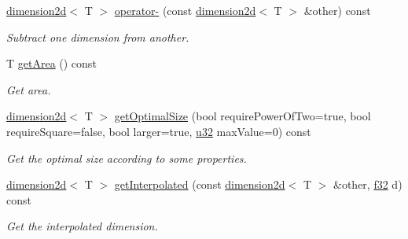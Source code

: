 \begin{DoxyCompactItemize}
\mbox{\label{classirr_1_1core_1_1dimension2d_aec5df4b45e5af7fa0fe13f2b0c6d5976}} 
\hyperlink{classirr_1_1core_1_1dimension2d}{dimension2d}$<$ T $>$ \hyperlink{classirr_1_1core_1_1dimension2d_aec5df4b45e5af7fa0fe13f2b0c6d5976}{operator-\/} (const \hyperlink{classirr_1_1core_1_1dimension2d}{dimension2d}$<$ T $>$ \&other) const
\begin{DoxyCompactList}\small\item\em Subtract one dimension from another. \end{DoxyCompactList}\item 
\mbox{\label{classirr_1_1core_1_1dimension2d_a320dee7a21500fd4625ab7660a33248b}} 
T \hyperlink{classirr_1_1core_1_1dimension2d_a320dee7a21500fd4625ab7660a33248b}{get\+Area} () const
\begin{DoxyCompactList}\small\item\em Get area. \end{DoxyCompactList}\item 
\hyperlink{classirr_1_1core_1_1dimension2d}{dimension2d}$<$ T $>$ \hyperlink{classirr_1_1core_1_1dimension2d_a5861f95f79fe5a23a0f2d867b6ca70fc}{get\+Optimal\+Size} (bool require\+Power\+Of\+Two=true, bool require\+Square=false, bool larger=true, \hyperlink{namespaceirr_a0416a53257075833e7002efd0a18e804}{u32} max\+Value=0) const
\begin{DoxyCompactList}\small\item\em Get the optimal size according to some properties. \end{DoxyCompactList}\item 
\hyperlink{classirr_1_1core_1_1dimension2d}{dimension2d}$<$ T $>$ \hyperlink{classirr_1_1core_1_1dimension2d_a30981123f90a2221acd85c1fe4364eee}{get\+Interpolated} (const \hyperlink{classirr_1_1core_1_1dimension2d}{dimension2d}$<$ T $>$ \&other, \hyperlink{namespaceirr_a0277be98d67dc26ff93b1a6a1d086b07}{f32} d) const
\begin{DoxyCompactList}\small\item\em Get the interpolated dimension. \end{DoxyCompactList}\end{DoxyCompactItemize}
